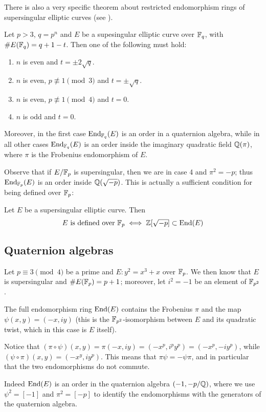 There is also a very specific theorem about restricted endomorphism rings of supersingular elliptic curves (see \cite{Waterhouse}).
\begin{theorem}
    Let $p>3$, $q=p^n$ and $E$ be a supesingular elliptic curve over $\mathbb{F}_q$, with $\# E(\mathbb{F}_q)=q+1-t$. Then one of the following must hold:
    \begin{enumerate}
        \item $n$ is even and $t=\pm2\sqrt{q}$.
        \item $n$ is even, $p\not\equiv1\pmod 3$ and $t=\pm\sqrt{q}$.
        \item $n$ is even, $p\not\equiv1\pmod 4$ and $t=0$.
        \item $n$ is odd and $t=0$.
    \end{enumerate}

    Moreover, in the first case $\operatorname{End}_{\mathbb{F}_q}(E)$ is an order in a quaternion algebra, while in all other cases $\operatorname{End}_{\mathbb{F}_q}(E)$ is an order inside the imaginary quadratic field $\mathbb{Q}(\pi)$, where $\pi$ is the Frobenius endomorphism of $E$.
\end{theorem}

Observe that if $E/\mathbb{F}_p$ is supersingular, then we are in case 4 and $\pi^2=-p$; thus $\operatorname{End}_{\mathbb{F}_p}(E)$ is an order inside $\mathbb{Q}(\sqrt{-p})$. This is actually a sufficient condition for being defined over $\mathbb{F}_p$:
\begin{proposition}
    Let $E$ be a supersingular elliptic curve. Then
    $$E \text{ is defined over } \mathbb{F}_p\iff \mathbb{Z}[\sqrt{-p}]\subset\operatorname{End}(E)$$
\end{proposition}

\subsection{Quaternion algebras}

\cite{QuatAlg}

\begin{example}
    Let $p\equiv3\pmod4$ be a prime and $E:y^2=x^3+x$ over $\mathbb{F}_p$. We then know that $E$ is supersingular and $\# E(\mathbb{F}_p)=p+1$; moreover, let $i^2=-1$ be an element of $\mathbb{F}_{p^2}$.
    
    The full endomorphism ring $\operatorname{End}(E)$ contains the Frobenius $\pi$ and the map $\psi(x,y)=(-x,iy)$ (this is the $\mathbb{F}_{p^2}$-isomorphism between $E$ and its quadratic twist, which in this case is $E$ itself).
    
    Notice that $(\pi\circ\psi)(x,y)=\pi(-x,iy)=(-x^p,i^py^p)=(-x^p,-iy^p)$, while $(\psi\circ\pi)(x,y)=(-x^y,iy^p)$. This means that $\pi\psi=-\psi\pi$, and in particular that the two endomorphisms do not commute.
    
    Indeed $\operatorname{End}(E)$ is an order in the quaternion algebra $(-1,-p/\mathbb{Q})$, where we use $\psi^2=[-1]$ and $\pi^2=[-p]$ to identify the endomorphisms with the generators of the quaternion algebra.
\end{example}

